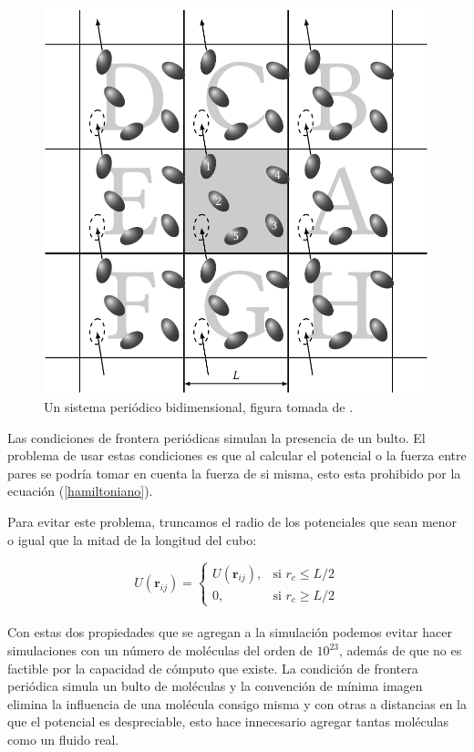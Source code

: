 \begin{figure}[!h]
    \centering
    \includegraphics[width=.7\textwidth,keepaspectratio=true]{PBC.png}
    \caption{Un sistema periódico bidimensional, figura tomada de \cite{Allen2017}.}
    \label{fig:PBC}
\end{figure}

Las condiciones de frontera periódicas simulan la presencia de un bulto. El problema de usar estas condiciones es que al calcular el potencial o la fuerza entre pares se podría tomar en cuenta la fuerza de si misma, esto esta prohibido por la ecuación (\ref{hamiltoniano}).

Para evitar este problema, truncamos el radio de los potenciales que sean menor o igual que la mitad de la longitud del cubo:

\begin{equation}\label{MIC}
    U(\mathbf{r}_{ij}) =
    \begin{cases} 
    U(\mathbf{r}_{ij}),& \text{si } r_c\leq L/2\\
    0,& \text{si } r_c\geq L/2
    \end{cases}
\end{equation}\\

Con estas dos propiedades que se agregan a la simulación podemos evitar hacer simulaciones con un número de moléculas del orden de $10^{23}$, además de que no es factible por la capacidad de cómputo que existe. La condición de frontera periódica simula un bulto de moléculas y la convención de mínima imagen elimina la influencia de una molécula consigo misma y con otras a distancias en la que el potencial es despreciable, esto hace innecesario agregar tantas moléculas como un fluido real.\\

